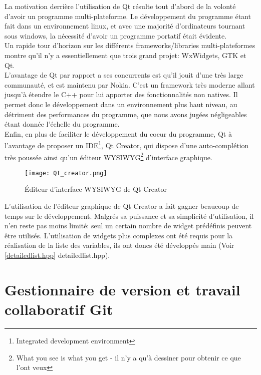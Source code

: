         La motivation derrière l'utilisation de Qt résulte tout d'abord de la volonté d'avoir un programme multi-plateforme. Le développement du programme étant fait dans un environnement linux, et avec une majorité d'ordinateurs tournant sous windows, la nécessité d'avoir un programme portatif était évidente.
        \\ Un rapide tour d'horizon sur les différents frameworks/libraries multi-plateformes montre qu'il n'y a essentiellement que trois grand projet: WxWidgets, GTK et Qt.
        \\ L'avantage de Qt par rapport a ses concurrents est qu'il jouit d'une très large communauté, et est maintenu par Nokia. C'est un framework très moderne allant jusqu'à étendre le C++ pour lui apporter des fonctionnalités non natives. Il permet donc le développement dans un environnement plus haut niveau, au détriment des performances du programme, que nous avons jugées négligeables étant donnée l'échelle du programme.
        \\ Enfin, en plus de faciliter le développement du coeur du programme, Qt à l'avantage de proposer un IDE\footnote{Integrated development environment}, Qt Creator, qui dispose d'une auto-complétion très poussée ainsi qu'un éditeur WYSIWYG\footnote{What you see is what you get - il n'y a qu'à dessiner pour obtenir ce que l'ont veux} d'interface graphique.

        \begin{figure}[h]
            \begin{center}
                \texttt{[image: Qt\_creator.png]}
            \end{center}

            \caption{Éditeur d'interface WYSIWYG de Qt Creator}
            \label{Qt Creator}
        \end{figure}

        L'utilisation de l'éditeur graphique de Qt Creator a fait gagner beaucoup de temps sur le développement. Malgrés sa puissance et sa simplicité d'utilisation, il n'en reste pas moins limité: seul un certain nombre de widget prédéfinis peuvent être utilisés. L'utilisation de widgets plus complexes ont été requis pour la réalisation de la liste des variables, ils ont doncs été développés main (Voir \ref{detailedlist.hpp} detailedlist.hpp).

    \newpage

    \section{Gestionnaire de version et travail collaboratif Git}
